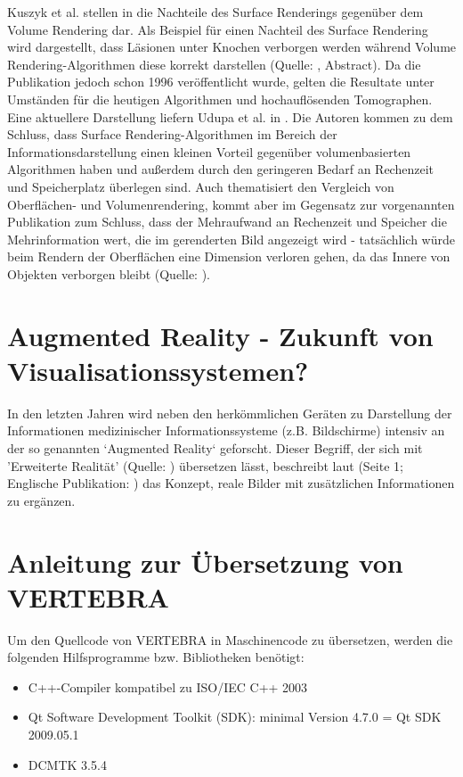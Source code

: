 \documentclass[a4paper,titlepage,12pt]{scrartcl}
\begin{document}
Kuszyk et al. stellen in \cite{Kuszyk1996} die Nachteile des Surface Renderings gegenüber dem Volume Rendering dar. Als Beispiel für einen Nachteil des Surface Rendering wird dargestellt, dass Läsionen unter Knochen verborgen werden während Volume Rendering-Algorithmen diese korrekt darstellen (Quelle: \cite{Kuszyk1996}, Abstract). Da die Publikation jedoch schon 1996 veröffentlicht wurde, gelten die Resultate unter Umständen für die heutigen Algorithmen und hochauflösenden Tomographen. Eine aktuellere Darstellung liefern Udupa et al. in \cite{Udupa2009}. Die Autoren kommen zu dem Schluss, dass Surface Rendering-Algorithmen im Bereich der Informationsdarstellung einen kleinen Vorteil gegenüber volumenbasierten Algorithmen haben und außerdem durch den geringeren Bedarf an Rechenzeit und Speicherplatz überlegen sind. Auch \cite{Bruckner2008} thematisiert den Vergleich von Oberflächen- und Volumenrendering, kommt aber im Gegensatz zur vorgenannten Publikation zum Schluss, dass der Mehraufwand an Rechenzeit und Speicher die Mehrinformation wert, die im gerenderten Bild angezeigt wird - tatsächlich würde beim Rendern der Oberflächen eine Dimension verloren gehen, da das Innere von Objekten verborgen bleibt (Quelle: \cite[Seite 6f.]{Bruckner2008}).

\section{Augmented Reality - Zukunft von Visualisationssystemen?}\label{sec:augmentedreality}
In den letzten Jahren wird neben den herkömmlichen Geräten zu Darstellung der Informationen medizinischer Informationssysteme (z.B. Bildschirme) intensiv an der so genannten `Augmented Reality` geforscht. Dieser Begriff, der sich mit 'Erweiterte Realität' (Quelle: \cite[Seite 1]{Toe2010}) übersetzen lässt, beschreibt laut \cite{Suthau2002DE} (Seite 1; Englische Publikation: \cite{Suthau2002}) das Konzept, reale Bilder mit zusätzlichen Informationen zu ergänzen.

\appendix \label{appendixstart}
\section{Anleitung zur Übersetzung von VERTEBRA}
Um den Quellcode von VERTEBRA in Maschinencode zu übersetzen, werden die folgenden Hilfsprogramme bzw. Bibliotheken benötigt:
\begin{itemize}
 \item C++-Compiler kompatibel zu ISO/IEC C++ 2003
 \item Qt Software Development Toolkit (SDK): minimal Version 4.7.0 = Qt SDK 2009.05.1
 \item DCMTK 3.5.4
\end{itemize}
\end{document}
